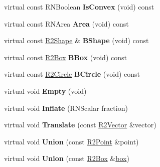 \begin{DoxyCompactItemize}
\item 
virtual const R\+N\+Boolean {\bfseries Is\+Convex} (void) const \hypertarget{class_r2_box_a6f495ebad69f37e6c5e8b5ef1ca3557b}{}\label{class_r2_box_a6f495ebad69f37e6c5e8b5ef1ca3557b}

\item 
virtual const R\+N\+Area {\bfseries Area} (void) const \hypertarget{class_r2_box_a424bd04630419ed44f1cbe2c3d56b15f}{}\label{class_r2_box_a424bd04630419ed44f1cbe2c3d56b15f}

\item 
virtual const \hyperlink{class_r2_shape}{R2\+Shape} \& {\bfseries B\+Shape} (void) const \hypertarget{class_r2_box_a856e96af2c43771e8fc6fab0a0d08d77}{}\label{class_r2_box_a856e96af2c43771e8fc6fab0a0d08d77}

\item 
virtual const \hyperlink{class_r2_box}{R2\+Box} {\bfseries B\+Box} (void) const \hypertarget{class_r2_box_a3fa3050507c86c4c27840e3abf6c8a04}{}\label{class_r2_box_a3fa3050507c86c4c27840e3abf6c8a04}

\item 
virtual const \hyperlink{class_r2_circle}{R2\+Circle} {\bfseries B\+Circle} (void) const \hypertarget{class_r2_box_a374f79e1fa6e6a6c8e8815281997080a}{}\label{class_r2_box_a374f79e1fa6e6a6c8e8815281997080a}

\item 
virtual void {\bfseries Empty} (void)\hypertarget{class_r2_box_adfa30dd7fb6fa949a04fe3619ba9806e}{}\label{class_r2_box_adfa30dd7fb6fa949a04fe3619ba9806e}

\item 
virtual void {\bfseries Inflate} (R\+N\+Scalar fraction)\hypertarget{class_r2_box_a9fcfbe9cd6ea1f7ffc6b990bf49eb4f5}{}\label{class_r2_box_a9fcfbe9cd6ea1f7ffc6b990bf49eb4f5}

\item 
virtual void {\bfseries Translate} (const \hyperlink{class_r2_vector}{R2\+Vector} \&vector)\hypertarget{class_r2_box_a5c516aba8ccf765494b1374642747660}{}\label{class_r2_box_a5c516aba8ccf765494b1374642747660}

\item 
virtual void {\bfseries Union} (const \hyperlink{class_r2_point}{R2\+Point} \&point)\hypertarget{class_r2_box_aae64766b9d5950e56cade1009838a422}{}\label{class_r2_box_aae64766b9d5950e56cade1009838a422}

\item 
virtual void {\bfseries Union} (const \hyperlink{class_r2_box}{R2\+Box} \&\hyperlink{structbox}{box})\hypertarget{class_r2_box_a7e4cf0e1f9ecbeea6bb31664d3b0ae58}{}\label{class_r2_box_a7e4cf0e1f9ecbeea6bb31664d3b0ae58}


\end{DoxyCompactItemize}
